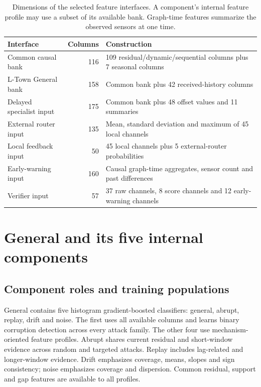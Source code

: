 \begin{table}[tbp]
\centering\small
\caption[Feature dimensions at each architectural interface]{Dimensions of the selected feature interfaces. A component's internal feature profile may use a subset of its available bank. Graph-time features summarize the observed sensors at one time.}
\label{tab:dimensions}
\begin{tabularx}{\linewidth}{@{}YrY@{}}
\toprule
Interface & Columns & Construction\\
\midrule
Common causal bank & 116 & 109 residual/dynamic/sequential columns plus 7 seasonal columns\\
L-Town General bank & 158 & Common bank plus 42 received-history columns\\
Delayed specialist input & 175 & Common bank plus 48 offset values and 11 summaries\\
External router input & 135 & Mean, standard deviation and maximum of 45 local channels\\
Local feedback input & 50 & 45 local channels plus 5 external-router probabilities\\
Early-warning input & 160 & Causal graph-time aggregates, sensor count and past differences\\
Verifier input & 57 & 37 raw channels, 8 score channels and 12 early-warning channels\\
\bottomrule
\end{tabularx}
\end{table}

\section{General and its five internal components}
\subsection{Component roles and training populations}
General contains five histogram gradient-boosted classifiers: general, abrupt, replay, drift and noise. The first uses all available columns and learns binary corruption detection across every attack family. The other four use mechanism-oriented feature profiles. Abrupt shares current residual and short-window evidence across random and targeted attacks. Replay includes lag-related and longer-window evidence. Drift emphasizes coverage, means, slopes and sign consistency; noise emphasizes coverage and dispersion. Common residual, support and gap features are available to all profiles.

